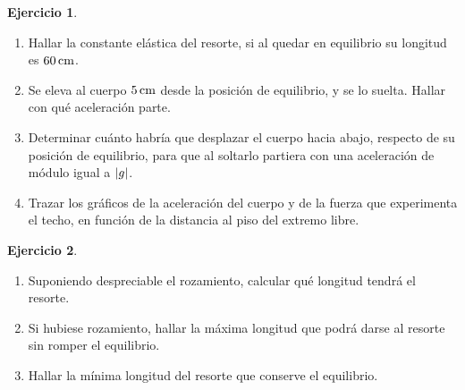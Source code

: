 \documentclass[a4paper,12pt,twoside]{book}
\newtheorem{ejercicio}{{Ejercicio}}[chapter]
\begin{document}
\begin{mdframed}[style=ejercicio-dificil]
    \begin{ejercicio}
    \end{ejercicio}
    \begin{enumerate}
        \item Hallar la constante elástica del resorte, si al quedar en equilibrio su longitud es $60 \, \si{\centi\metre}$.
        \item Se eleva al cuerpo $5 \, \si{\centi\metre}$ desde la posición de equilibrio, y se lo suelta.
        Hallar con qué aceleración parte.
        \item Determinar cuánto habría que desplazar el cuerpo hacia abajo, respecto de su posición de equilibrio, para que al soltarlo partiera con una aceleración de módulo igual a ${\left| {g} \right|}$.
        \item Trazar los gráficos de la aceleración del cuerpo y de la fuerza que experimenta el techo, en función de la distancia al piso del extremo libre.
    \end{enumerate}
\end{mdframed}

\begin{mdframed}[style=ejercicio-intermedio]
    \begin{ejercicio}
    \end{ejercicio}
    \begin{center}
        \def\svgwidth{0.5\linewidth}
        
    \end{center}
    \begin{enumerate}
        \item Suponiendo despreciable el rozamiento, calcular qué longitud tendrá el resorte.
        \item Si hubiese rozamiento, hallar la máxima longitud que podrá darse al resorte sin romper el equilibrio.
        \item Hallar la mínima longitud del resorte que conserve el equilibrio.
    \end{enumerate}
\end{mdframed}
\end{document}
